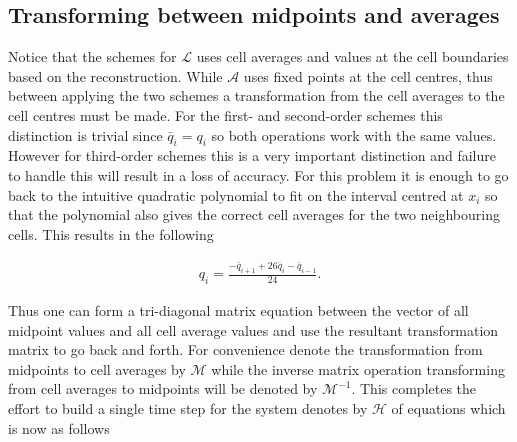 \documentclass[SingleSpace,12pt]{Serre_ASCE}
\begin{document}
\subsection{Transforming between midpoints and averages} %
Notice that the schemes for $\mathcal{L}$ uses cell averages and values at the cell boundaries based on the reconstruction. While $\mathcal{A}$ uses fixed points at the cell centres, thus between applying the two schemes a transformation from the cell averages to the cell centres must be made. For the first- and second-order schemes this distinction is trivial since $\bar{q}_i = q_i$ so both operations work with the same values. However for third-order schemes this is a very important distinction and failure to handle this will result in a loss of accuracy. For this problem it is enough to go back to the intuitive quadratic polynomial to fit on the interval centred at $x_i$ so that the polynomial also gives the correct cell averages for the two neighbouring cells. This results in the following
\begin{linenomath*}
\begin{gather}\label{eq:midtoca}
q_i = \frac{- \bar{q}_{i+1} + 26\bar{q}_{i} - \bar{q}_{i-1}}{24}.
\end{gather}
\end{linenomath*}
Thus one can form a tri-diagonal matrix equation between the vector of all midpoint values and all cell average values and use the resultant transformation matrix to go back and forth. For convenience denote the transformation from midpoints to cell averages by $\mathcal{M}$ while the inverse matrix operation transforming from cell averages to midpoints will be denoted by $\mathcal{M}^{-1}$. This completes the effort to build a single time step for the system denotes by $\mathcal{H}$ of equations which is now as follows
\end{document}
